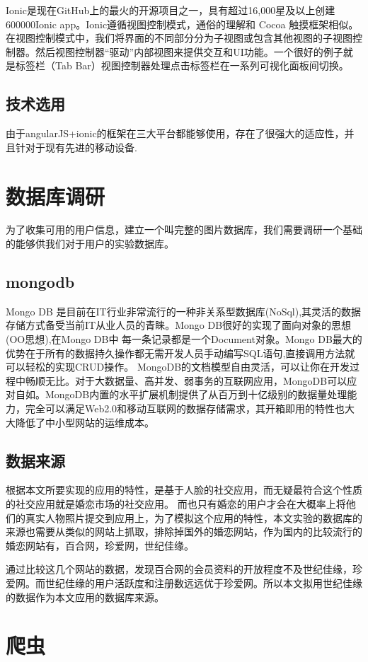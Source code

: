 Ionic是现在GitHub上的最火的开源项目之一，具有超过16,000星及以上创建600000Ionic app。Ionic遵循视图控制模式，通俗的理解和 Cocoa 触摸框架相似。在视图控制模式中，我们将界面的不同部分分为子视图或包含其他视图的子视图控制器。然后视图控制器“驱动”内部视图来提供交互和UI功能。一个很好的例子就是标签栏（Tab Bar）视图控制器处理点击标签栏在一系列可视化面板间切换。
\subsection{技术选用}
由于angularJS+ionic的框架在三大平台都能够使用，存在了很强大的适应性，并且针对于现有先进的移动设备.

\section{数据库调研}
为了收集可用的用户信息，建立一个叫完整的图片数据库，我们需要调研一个基础的能够供我们对于用户的实验数据库。
\subsection{mongodb}
Mongo DB 是目前在IT行业非常流行的一种非关系型数据库(NoSql),其灵活的数据存储方式备受当前IT从业人员的青睐。Mongo DB很好的实现了面向对象的思想(OO思想),在Mongo DB中 每一条记录都是一个Document对象。Mongo DB最大的优势在于所有的数据持久操作都无需开发人员手动编写SQL语句,直接调用方法就可以轻松的实现CRUD操作。
MongoDB的文档模型自由灵活，可以让你在开发过程中畅顺无比。对于大数据量、高并发、弱事务的互联网应用，MongoDB可以应对自如。MongoDB内置的水平扩展机制提供了从百万到十亿级别的数据量处理能力，完全可以满足Web2.0和移动互联网的数据存储需求，其开箱即用的特性也大大降低了中小型网站的运维成本。

\subsection{数据来源}
根据本文所要实现的应用的特性，是基于人脸的社交应用，而无疑最符合这个性质的社交应用就是婚恋市场的社交应用。
而也只有婚恋的用户才会在大概率上将他们的真实人物照片提交到应用上，为了模拟这个应用的特性，本文实验的数据库的来源也需要从类似的网站上抓取，排除掉国外的婚恋网站，作为国内的比较流行的婚恋网站有，百合网，珍爱网，世纪佳缘。


通过比较这几个网站的数据，发现百合网的会员资料的开放程度不及世纪佳缘，珍爱网。而世纪佳缘的用户活跃度和注册数远远优于珍爱网。所以本文拟用世纪佳缘的数据作为本文应用的数据库来源。

\section{爬虫}
